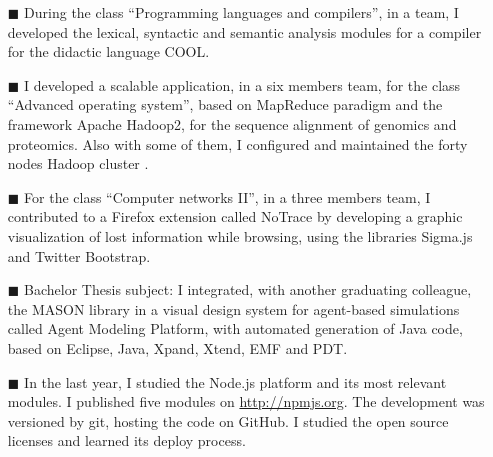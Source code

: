 \documentclass[helvetica,english,logo,notitle,totpages,utf8]{europecv2013}
\begin{document}
\begin{europecv}
{\begin{itemize}
	\item[\color{curious-blue}\tiny$\blacksquare$] During the class “Programming languages and compilers”, in a team, I developed the lexical, syntactic and semantic analysis modules for a compiler for the didactic language COOL.
	\item[\color{curious-blue}\tiny$\blacksquare$] I developed a scalable application, in a six members team, for the class “Advanced operating system”, based on MapReduce paradigm and the framework Apache Hadoop2, for the sequence alignment of genomics and proteomics. Also with some of them, I configured and maintained the forty nodes Hadoop cluster .
	\item[\color{curious-blue}\tiny$\blacksquare$] For the class “Computer networks II”, in a three members team, I contributed to a Firefox extension called NoTrace by developing a graphic visualization of lost information while browsing, using the libraries Sigma.js and Twitter Bootstrap.
	\item[\color{curious-blue}\tiny$\blacksquare$] Bachelor Thesis subject: I integrated, with another graduating colleague, the MASON library in a visual design system for agent-based simulations called Agent Modeling Platform, with automated generation of Java code, based on Eclipse, Java, Xpand, Xtend, EMF and PDT.
	\item[\color{curious-blue}\tiny$\blacksquare$] In the last year, I studied the Node.js platform and its most relevant modules. I published five modules on \url{http://npmjs.org}. The development was versioned by git, hosting the code on GitHub. I studied the open source licenses and learned its deploy process.
\end{itemize}
}








\end{europecv}
\end{document}
